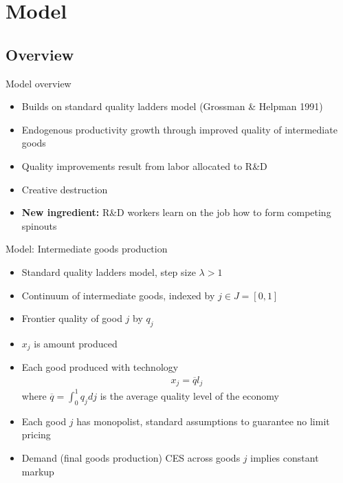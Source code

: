 \documentclass[english,usenames,dvipsnames]{beamer}
\begin{document}
\section{Model}
\subsection{Overview}
\begin{frame}{Model overview}
\begin{itemize}	
	\item Builds on standard quality ladders model (Grossman \& Helpman 1991)
	\item Endogenous productivity growth through improved quality of intermediate goods 
	\item Quality improvements result from labor allocated to R\&D
	\item Creative destruction
	\item \textbf{New ingredient:} R\&D workers learn on the job how to form competing spinouts 
\end{itemize}
\end{frame}

\begin{frame}{Model: Intermediate goods production}
\begin{itemize}
	\item Standard quality ladders model, step size $\lambda > 1$
	\item Continuum of intermediate goods, indexed by $j\in J = [0,1]$
	\item Frontier quality of good $j$ by $q_j$
	\item $x_j$ is amount produced 
	\item Each good produced with technology
	\begin{align*}
	x_j = \overline{q} l_j
	\end{align*}
	where $\overline{q} = \int_0^1 q_j dj$ is the average quality level of the economy
	\item Each good $j$ has monopolist, standard assumptions to guarantee no limit pricing 
	\item Demand (final goods production) CES across goods $j$ implies constant markup
\end{itemize}
\end{frame}
\end{document}
